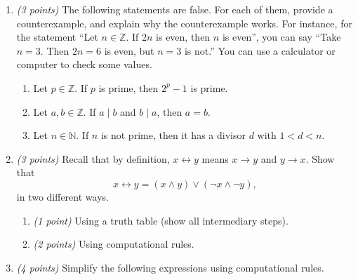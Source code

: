\documentclass[12pt]{article}
\begin{document}
\begin{enumerate}[label=\textbf{\arabic*.}, itemsep=1.2em]

\item \emph{(3 points)} The following statements are false. For each of them, provide a counterexample, and explain why the counterexample works. For instance, for the statement ``Let \(n \in \mathbb{Z}\). If \(2n\) is even, then \(n\) is even'', you can say ``Take \(n = 3\). Then \(2n = 6\) is even, but \(n = 3\) is not.'' You can use a calculator or computer to check some values.

\begin{enumerate}[label=\textbf{\alph*.}, itemsep=1em]
    \item Let \(p \in \mathbb{Z}\). If \(p\) is prime, then \(2^p - 1\) is prime. \newline

    \item Let \(a, b \in \mathbb{Z}\). If \(a \mid b\) and \(b \mid a\), then \(a = b\). \newline

    \item Let \(n \in \mathbb{N}\). If \(n\) is not prime, then it has a divisor \(d\) with \(1 < d < n\). \newline

\end{enumerate}

\item \emph{(3 points)} Recall that by definition, \(x \leftrightarrow y\) means \(x \to y\) and \(y \to x\). Show that
\[
x \leftrightarrow y = (x \wedge y) \vee (\neg x \wedge \neg y),
\]
in two different ways.

\begin{enumerate}[label=\textbf{\alph*.}, itemsep=0.8em]
    \item \emph{(1 point)} Using a truth table (show all intermediary steps). \newline
    
    \item \emph{(2 points)} Using computational rules. \newline
\end{enumerate}

\item \emph{(4 points)} Simplify the following expressions using computational rules.


\end{enumerate}
\end{document}
